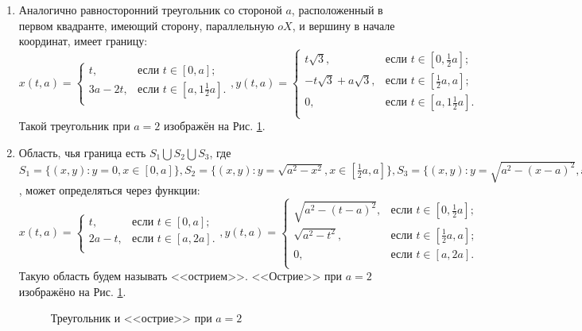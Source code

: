 \documentclass[a4paper, 12pt]{article}
\begin{document}
\begin{enumerate}
    \item Аналогично равносторонний треугольник со стороной $a$, расположенный в первом квадранте, имеющий сторону, параллельную $oX$, и вершину в начале координат, имеет границу:
    \[
        x(t,a) =
        \begin{cases}
        t, & \text{если $t \in [0,a]$;} \\
        3a-2t, & \text{если $t \in [a,1\frac{1}{2}a]$.} \\
        \end{cases},
        y(t,a) =
        \begin{cases}
        t \sqrt{3}, & \text{если $t \in [0,\frac{1}{2}a]$;} \\
        -t \sqrt{3}+a\sqrt{3}, & \text{если $t \in [\frac{1}{2}a,a]$;} \\
        0, & \text{если $t \in [a,1\frac{1}{2}a]$.} \\
        \end{cases}
        \]
        Такой треугольник при $a=2$ изображён на Рис. \ref{tros}.

    \item Область, чья граница есть $S_1 \bigcup S_2 \bigcup S_3$, где $S_1=\{(x,y): y=0, x \in [0, a]\},S_2=\{(x,y): y=\sqrt{a^2-x^2}, x \in [\frac{1}{2}a, a]\},S_3=\{(x,y): y=\sqrt{a^2-(x-a)^2}, x \in [0,\frac{1}{2} a]\}$, может определяться через функции:       
    \[
        x(t,a) =
        \begin{cases}
        t, & \text{если $t \in [0,a]$;} \\
        2a-t, & \text{если $t \in [a,2a]$.} \\
        \end{cases},
        y(t,a) =
        \begin{cases}
        \sqrt{a^2-(t-a)^2}, & \text{если $t \in [0,\frac{1}{2}a]$;} \\
        \sqrt{a^2-t^2}, & \text{если $t \in [\frac{1}{2}a,a]$;} \\
        0, & \text{если $t \in [a,2a]$.} \\
        \end{cases}
        \]
        Такую область будем называть <<острием>>. <<Острие>> при $a=2$ изображёно на Рис. \ref{tros}.
        
        \begin{figure}[h!]
          \noindent{}
          \caption{Треугольник и <<острие>> при $a=2$}
          \label{tros}
          \end{figure}  
\end{enumerate}
\end{document}

